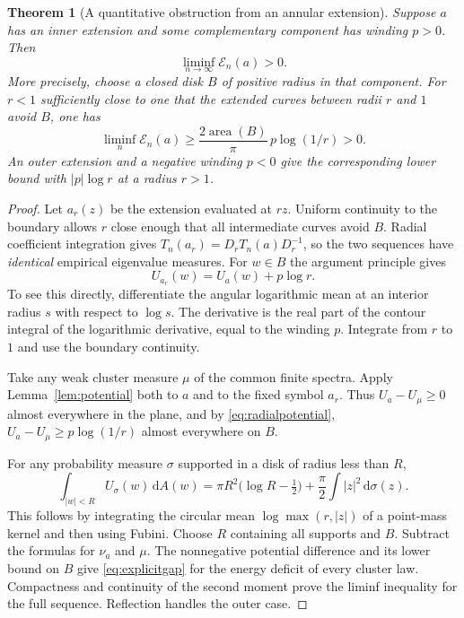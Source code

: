 \documentclass[11pt]{article}
\newtheorem{theorem}{Theorem}[section]
\theoremstyle{definition}
\newcommand{\E}{\mathcal E}
\newcommand{\dd}{\,\mathrm d}
\begin{document}
\begin{theorem}[A quantitative obstruction from an annular extension]\label{thm:extension-obstruction}
Suppose $a$ has an inner extension and some complementary component has winding $p>0$. Then
\begin{equation}
 \liminf_{n\to\infty}\E_n(a)>0.
 \label{eq:positive-liminf}
\end{equation}
More precisely, choose a closed disk $B$ of positive radius in that component. For $r<1$ sufficiently close to one that the extended curves between radii $r$ and $1$ avoid $B$, one has
\begin{equation}
 \liminf_n\E_n(a)\ge \frac{2\operatorname{area}(B)}{\pi}\,p\log(1/r)>0.
 \label{eq:explicitgap}
\end{equation}
An outer extension and a negative winding $p<0$ give the corresponding lower bound with $|p|\log r$ at a radius $r>1$.
\end{theorem}
\begin{proof}
Let $a_r(z)$ be the extension evaluated at $rz$. Uniform continuity to the boundary allows $r$ close enough that all intermediate curves avoid $B$. Radial coefficient integration gives $T_n(a_r)=D_rT_n(a)D_r^{-1}$, so the two sequences have \emph{identical} empirical eigenvalue measures. For $w\in B$ the argument principle gives
\begin{equation}
 U_{a_r}(w)=U_a(w)+p\log r.
 \label{eq:radialpotential}
\end{equation}
To see this directly, differentiate the angular logarithmic mean at an interior radius $s$ with respect to $\log s$. The derivative is the real part of the contour integral of the logarithmic derivative, equal to the winding $p$. Integrate from $r$ to $1$ and use the boundary continuity.

Take any weak cluster measure $\mu$ of the common finite spectra. Apply Lemma~\ref{lem:potential} both to $a$ and to the fixed symbol $a_r$. Thus $U_a-U_\mu\ge0$ almost everywhere in the plane, and by \eqref{eq:radialpotential}, $U_a-U_\mu\ge p\log(1/r)$ almost everywhere on $B$.

For any probability measure $\sigma$ supported in a disk of radius less than $R$,
\begin{equation}
 \int_{|w|<R}U_\sigma(w)\dd A(w)
 =\pi R^2\bigl(\log R-\tfrac12\bigr)+\frac\pi2\int|z|^2\dd\sigma(z).
 \label{eq:areaenergy}
\end{equation}
This follows by integrating the circular mean $\log\max(r,|z|)$ of a point-mass kernel and then using Fubini. Choose $R$ containing all supports and $B$. Subtract the formulas for $\nu_a$ and $\mu$. The nonnegative potential difference and its lower bound on $B$ give \eqref{eq:explicitgap} for the energy deficit of every cluster law. Compactness and continuity of the second moment prove the liminf inequality for the full sequence. Reflection handles the outer case.
\end{proof}
\end{document}
